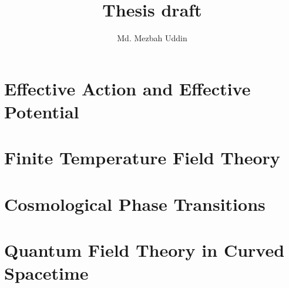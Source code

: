 \documentclass[12pt,a4paper]{book}
\title{Thesis draft}
\author{Md. Mezbah Uddin}
\date{}
\begin{document}
\frontmatter
\maketitle
\tableofcontents

\mainmatter



\part{Effective Action and Effective Potential}








\part{Finite Temperature Field Theory}



\part{Cosmological Phase Transitions}









\part{Quantum Field Theory in Curved Spacetime}











\appendix

\backmatter


\end{document}

